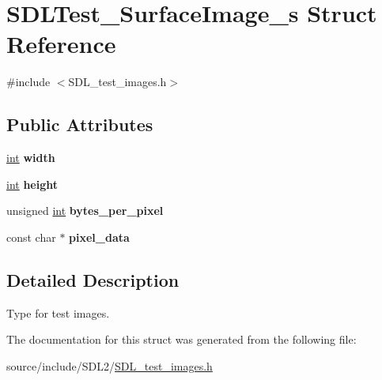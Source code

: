 \hypertarget{struct_s_d_l_test___surface_image__s}{}\section{S\+D\+L\+Test\+\_\+\+Surface\+Image\+\_\+s Struct Reference}
\label{struct_s_d_l_test___surface_image__s}


{\ttfamily \#include $<$S\+D\+L\+\_\+test\+\_\+images.\+h$>$}

\subsection*{Public Attributes}
\begin{DoxyCompactItemize}
\item 
\hypertarget{struct_s_d_l_test___surface_image__s_a3cbacf6b015a22832ab4d3f509719609}{}\hyperlink{_s_d_l__thread_8h_a6a64f9be4433e4de6e2f2f548cf3c08e}{int} {\bfseries width}\label{struct_s_d_l_test___surface_image__s_a3cbacf6b015a22832ab4d3f509719609}

\item 
\hypertarget{struct_s_d_l_test___surface_image__s_a310092874695556e4b7f1f63aec24213}{}\hyperlink{_s_d_l__thread_8h_a6a64f9be4433e4de6e2f2f548cf3c08e}{int} {\bfseries height}\label{struct_s_d_l_test___surface_image__s_a310092874695556e4b7f1f63aec24213}

\item 
\hypertarget{struct_s_d_l_test___surface_image__s_a2daf91bab3d79fb9dfa25e8ade43e606}{}unsigned \hyperlink{_s_d_l__thread_8h_a6a64f9be4433e4de6e2f2f548cf3c08e}{int} {\bfseries bytes\+\_\+per\+\_\+pixel}\label{struct_s_d_l_test___surface_image__s_a2daf91bab3d79fb9dfa25e8ade43e606}

\item 
\hypertarget{struct_s_d_l_test___surface_image__s_acf2d3006bea5690f564d3003d1512fa7}{}const char $\ast$ {\bfseries pixel\+\_\+data}\label{struct_s_d_l_test___surface_image__s_acf2d3006bea5690f564d3003d1512fa7}

\end{DoxyCompactItemize}


\subsection{Detailed Description}
Type for test images. 

The documentation for this struct was generated from the following file\+:\begin{DoxyCompactItemize}
\item 
source/include/\+S\+D\+L2/\hyperlink{_s_d_l__test__images_8h}{S\+D\+L\+\_\+test\+\_\+images.\+h}\end{DoxyCompactItemize}
